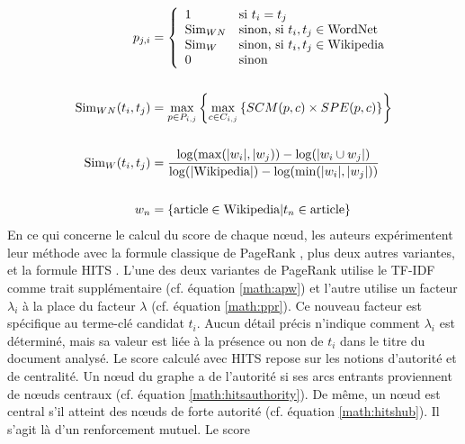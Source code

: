          \begin{align}
            p_{j, i} &= \left\{\begin{array}{ll}
              1 & \text{si $t_i = t_j$}\\
              \text{Sim}_{WN} & \text{sinon, si $t_i, t_j \in \text{WordNet}$}\\
               \text{Sim}_{W} &  \text{sinon, si $t_i, t_j \in \text{Wikipedia}$}\\
              0 & \text{sinon}
            \end{array}\right. \label{math:semanticrank}\\
            \notag\\
            \text{Sim}_{WN}(t_i, t_j) &= \max_{p \in P_{i, j}}\left\{\max_{c \in C_{i, j}}\left\{SCM(p, c) \times SPE(p, c)\right\}\right\} \label{math:wordnetsemanticrelatedness}\\
            \notag\\
            \text{Sim}_{W}(t_i, t_j) &= \frac{\log(\max(|w_i|, |w_j)) - \log(|w_i \cup w_j|)}{\log(|\text{Wikipedia}|) - \log(\min(|w_i|, |w_j|))} \label{math:wikipediasemanticrelatedness}\\
            \notag\\
            w_n &= \left\{\text{article} \in \text{Wikipedia} | t_n \in \text{article}\right\} \notag
          \end{align}
          En ce qui concerne le calcul du score de chaque n\oe{}ud, les auteurs
          expérimentent leur méthode avec la formule classique de PageRank
          \cite{brin1998pagerank}, plus deux autres variantes, et la formule
          HITS \cite{kleinberg1999hits}. L'une des deux variantes de PageRank
          utilise le TF-IDF comme trait supplémentaire (cf. équation
          \ref{math:apw}) et l'autre utilise un facteur $\lambda_i$ à la place
          du facteur $\lambda$ (cf. équation \ref{math:ppr}). Ce nouveau facteur
          est spécifique au terme-clé candidat $t_i$. Aucun détail précis
          n'indique comment $\lambda_i$ est déterminé, mais sa valeur est liée à
          la présence ou non de $t_i$ dans le titre du document analysé. Le
          score calculé avec HITS repose sur les notions d'autorité et de
          centralité. Un n\oe{}ud du graphe a de l'autorité si ses arcs entrants
          proviennent de n\oe{}uds centraux (cf. équation
          \ref{math:hitsauthority}). De même, un n\oe{}ud est central s'il
          atteint des n\oe{}uds de forte autorité (cf. équation
          \ref{math:hitshub}). Il s'agit là d'un renforcement mutuel. Le score
